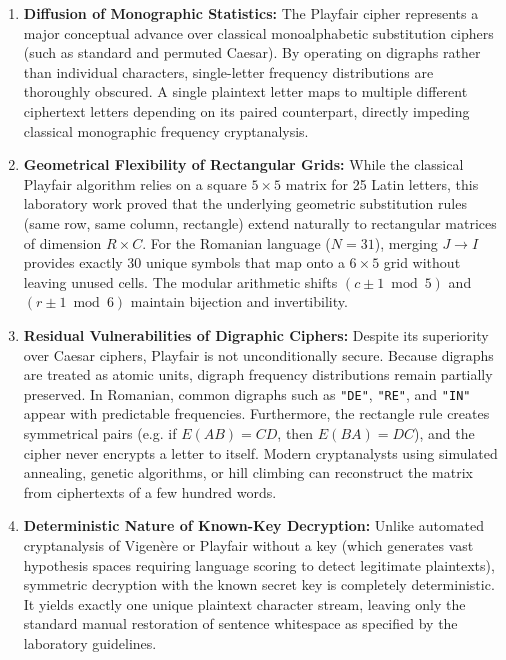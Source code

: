 \documentclass{labreport}
\begin{document}
\begin{enumerate}
    \item \textbf{Diffusion of Monographic Statistics:} The Playfair cipher represents a major conceptual advance over classical monoalphabetic substitution ciphers (such as standard and permuted Caesar). By operating on digraphs rather than individual characters, single-letter frequency distributions are thoroughly obscured. A single plaintext letter maps to multiple different ciphertext letters depending on its paired counterpart, directly impeding classical monographic frequency cryptanalysis.
    
    \item \textbf{Geometrical Flexibility of Rectangular Grids:} While the classical Playfair algorithm relies on a square $5 \times 5$ matrix for 25 Latin letters, this laboratory work proved that the underlying geometric substitution rules (same row, same column, rectangle) extend naturally to rectangular matrices of dimension $R \times C$. For the Romanian language ($N = 31$), merging $J \to I$ provides exactly 30 unique symbols that map onto a $6 \times 5$ grid without leaving unused cells. The modular arithmetic shifts $(c \pm 1 \bmod 5)$ and $(r \pm 1 \bmod 6)$ maintain bijection and invertibility.
    
    \item \textbf{Residual Vulnerabilities of Digraphic Ciphers:} Despite its superiority over Caesar ciphers, Playfair is not unconditionally secure. Because digraphs are treated as atomic units, digraph frequency distributions remain partially preserved. In Romanian, common digraphs such as \texttt{"DE"}, \texttt{"RE"}, and \texttt{"IN"} appear with predictable frequencies. Furthermore, the rectangle rule creates symmetrical pairs (e.g. if $E(AB) = CD$, then $E(BA) = DC$), and the cipher never encrypts a letter to itself. Modern cryptanalysts using simulated annealing, genetic algorithms, or hill climbing can reconstruct the matrix from ciphertexts of a few hundred words.
    
    \item \textbf{Deterministic Nature of Known-Key Decryption:} Unlike automated cryptanalysis of Vigen\`{e}re or Playfair without a key (which generates vast hypothesis spaces requiring language scoring to detect legitimate plaintexts), symmetric decryption with the known secret key is completely deterministic. It yields exactly one unique plaintext character stream, leaving only the standard manual restoration of sentence whitespace as specified by the laboratory guidelines.
\end{enumerate}
\end{document}
